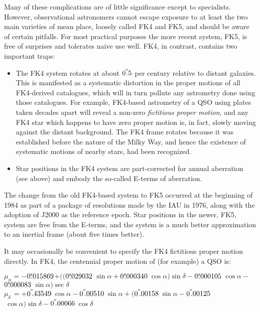 \documentclass[11pt,twoside]{article}
\newcommand{\arcsec}[2] {\arcseci{#1}$\hspace{-0.4em}.#2$}
\newcommand{\arcsec}[2] {
      {$#1\hspace{-0.05em}^{'\hspace{-0.1em}'}\hspace{-0.4em}.#2$}
   }
\newcommand{\arcseci}[1] {$#1\hspace{-0.05em}$\raisebox{-0.5ex}
                         {$^{'\hspace{-0.1em}'}$}}
\renewcommand{\arcseci}[1] {$#1\hspace{-0.05em}^{'\hspace{-0.1em}'}$}
\newcommand{\tseci}[1]   {$#1$\mbox{$^{\rm s}$}}
\newcommand{\tsec}[2]    {\tseci{#1}$\hspace{-0.3em}.#2$}
\renewcommand{\tsec}[2] {$#1^{\rm s}\hspace{-0.3em}.#2$}
\begin{document}
Many of these complications are of little significance except to
specialists.  However, observational astronomers cannot
escape exposure to at least the two main varieties of
mean place, loosely called
FK4 and FK5, and should be aware of
certain pitfalls.  For most practical purposes the more recent
system, FK5, is free of surprises and tolerates naive
use well.  FK4, in contrast, contains two important traps:
\begin{itemize}
\item The FK4 system rotates at about
      \arcsec{0}{5} per century relative to distant galaxies.
      This is manifested as a systematic distortion in the
      proper motions of all FK4-derived catalogues, which will
      in turn pollute any astrometry done using those catalogues.
      For example, FK4-based astrometry of a QSO using plates
      taken decades apart will reveal a non-zero {\it fictitious proper
      motion}, and any FK4 star which happens to have zero proper
      motion is, in fact, slowly moving against the distant
      background.  The FK4 frame rotates because it was
      established before the nature of the Milky Way, and hence the
      existence of systematic motions of nearby stars, had been
      recognized.
\item Star positions in the FK4 system are part-corrected for
      annual aberration (see above) and embody the so-called
      E-terms of aberration.
\end{itemize}
The change from the old FK4-based system to FK5
occurred at the beginning
of 1984 as part of a package of resolutions made by the IAU in 1976,
along with the adoption of J2000 as the reference epoch.  Star
positions in the newer, FK5, system are free from the E-terms, and
the system is a much better approximation to an
inertial frame (about five times better).

It may occasionally be convenient to specify the FK4 fictitious proper
motion directly.  In FK4, the centennial proper motion of (for example)
a QSO is:

$\mu_\alpha=-$\tsec{0}{015869}$
          +(($\tsec{0}{029032}$~\sin \alpha
            +$\tsec{0}{000340}$~\cos \alpha ) \sin \delta
            -$\tsec{0}{000105}$~\cos \alpha
            -$\tsec{0}{000083}$~\sin \alpha ) \sec \delta $ \\
$\mu_\delta\,=+$\arcsec{0}{43549}$~\cos \alpha
              -$\arcsec{0}{00510}$~\sin \alpha +
              ($\arcsec{0}{00158}$~\sin \alpha
              -$\arcsec{0}{00125}$~\cos \alpha ) \sin \delta
              -$\arcsec{0}{00066}$~\cos \delta $
\end{document}
